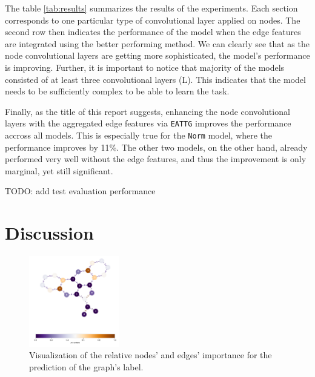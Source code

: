 \documentclass[10pt,twocolumn]{article}
\begin{document}
The table \ref{tab:results} summarizes the results of the experiments. Each section
corresponds to one particular type of convolutional layer applied on nodes. The second
row then indicates the performance of the model when the edge features are integrated using
the better performing method. We can clearly see that as the node convolutional layers
are getting more sophisticated, the model's performance is improving. Further, it is important to notice
that majority of the models consisted of at least three convolutional layers (L). This indicates
that the model needs to be sufficiently complex to be able to learn the task. 

Finally, as the title of this report suggests, enhancing the node convolutional layers with
the aggregated edge features via \texttt{EATTG} improves the performance accross all models.
This is especially true for the \texttt{Norm} model, where the performance
improves by 11\%. The other two models, on the other hand, already
performed very well without the edge features, and thus the improvement is only marginal, yet
still significant. 

TODO: add test evaluation performance

\section{Discussion}

\begin{figure}[!ht]
    \centering
    \includegraphics[width=0.35\textwidth]{figures/interpret.png}
    \caption{Visualization of the relative nodes' and edges' importance for the prediction of the graph's label.}
    \label{fig:attribution}
\end{figure}
\end{document}
